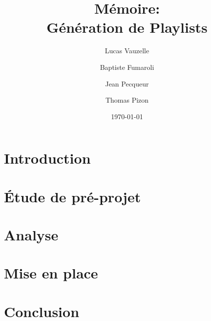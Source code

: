 \documentclass[a4paper, 11pt]{memoir}
\title{Mémoire:\\ Génération de Playlists}
\author{Lucas Vauzelle \and Baptiste Fumaroli \and Jean Pecqueur \and Thomas Pizon}
\date{\today}
\begin{document}
\maketitle %
\clearpage

\frontmatter*

\chapter*{Introduction}


\clearpage

\tableofcontents

\mainmatter*

\chapter{Étude de pré-projet}

\chapter{Analyse} %

\chapter{Mise en place} %

\chapter*{Conclusion}


\backmatter

% 
% 

\listoffigures
\end{document}
